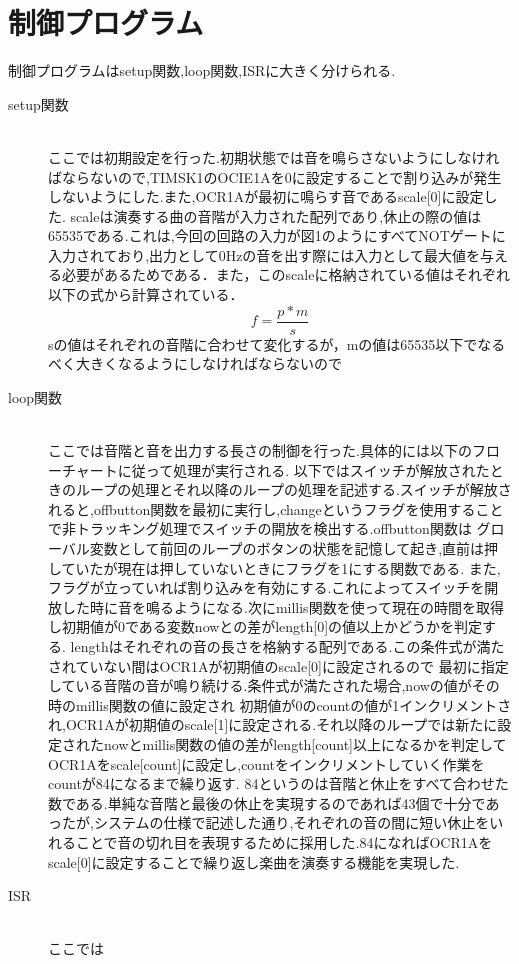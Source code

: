 \documentclass[dvipdfmx]{jarticle}
\begin{document}
\section{制御プログラム}
制御プログラムはsetup関数,loop関数,ISRに大きく分けられる.
\begin{description}
    \item[setup関数]\mbox{}\\
    ここでは初期設定を行った.初期状態では音を鳴らさないようにしなければならないので,TIMSK1のOCIE1Aを0に設定することで割り込みが発生しないようにした.また,OCR1Aが最初に鳴らす音であるscale[0]に設定した.
    scaleは演奏する曲の音階が入力された配列であり,休止の際の値は65535である.これは,今回の回路の入力が図1のようにすべてNOTゲートに入力されており,出力として0Hzの音を出す際には入力として最大値を与える必要があるためである．また，このscaleに格納されている値はそれぞれ以下の式から計算されている．
    \begin{equation}
        f=\frac{p*m}{s}
    \end{equation}
    sの値はそれぞれの音階に合わせて変化するが，mの値は65535以下でなるべく大きくなるようにしなければならないので
    \item[loop関数]\mbox{}\\
    ここでは音階と音を出力する長さの制御を行った.具体的には以下のフローチャートに従って処理が実行される.
    以下ではスイッチが解放されたときのループの処理とそれ以降のループの処理を記述する.スイッチが解放されると,offbutton関数を最初に実行し,changeというフラグを使用することで非トラッキング処理でスイッチの開放を検出する.offbutton関数は
    グローバル変数として前回のループのボタンの状態を記憶して起き,直前は押していたが現在は押していないときにフラグを1にする関数である.
    また, フラグが立っていれば割り込みを有効にする.これによってスイッチを開放した時に音を鳴るようになる.次にmillis関数を使って現在の時間を取得し初期値が0である変数nowとの差がlength[0]の値以上かどうかを判定する.
    lengthはそれぞれの音の長さを格納する配列である.この条件式が満たされていない間はOCR1Aが初期値のscale[0]に設定されるので  最初に指定している音階の音が鳴り続ける.条件式が満たされた場合,nowの値がその時のmillis関数の値に設定され
    初期値が0のcountの値が1インクリメントされ,OCR1Aが初期値のscale[1]に設定される.それ以降のループでは新たに設定されたnowとmillis関数の値の差がlength[count]以上になるかを判定してOCR1Aをscale[count]に設定し,countをインクリメントしていく作業をcountが84になるまで繰り返す.
    84というのは音階と休止をすべて合わせた数である.単純な音階と最後の休止を実現するのであれば43個で十分であったが,システムの仕様で記述した通り,それぞれの音の間に短い休止をいれることで音の切れ目を表現するために採用した.84になればOCR1Aをscale[0]に設定することで繰り返し楽曲を演奏する機能を実現した.
    \item[ISR]\mbox{}\\
    ここでは
\end{description}
\end{document}
